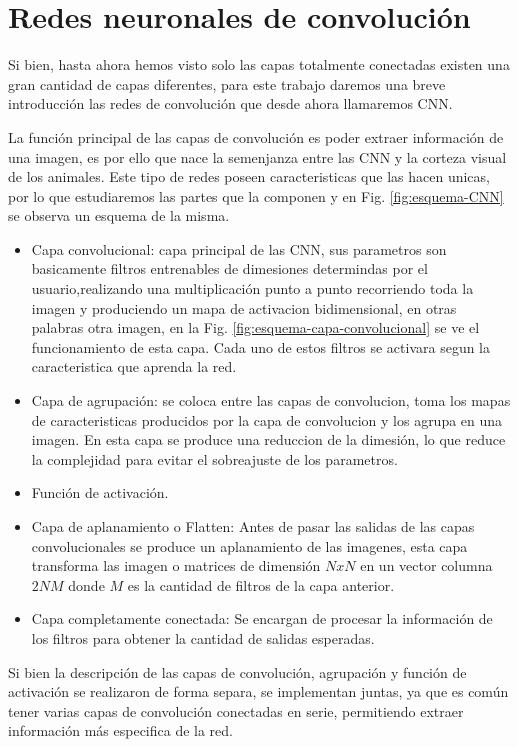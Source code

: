 \section{Redes neuronales de convolución}

Si bien, hasta ahora hemos visto solo las capas totalmente conectadas existen una gran cantidad de capas diferentes, para este trabajo daremos una breve introducción las redes de convolución que desde ahora llamaremos CNN.

La función principal de las capas de convolución es poder extraer información de una imagen, es por ello que nace la semenjanza entre las CNN y la corteza visual de los animales.
Este tipo de redes poseen caracteristicas que las hacen unicas, por lo que
estudiaremos las partes que la componen y en Fig. \ref{fig:esquema-CNN} se observa un esquema de la misma.
\begin{itemize}
    \item Capa convolucional: capa principal de las CNN, sus parametros son basicamente filtros entrenables de dimesiones determindas por el
          usuario,realizando una multiplicación punto a punto recorriendo toda la imagen y produciendo un mapa de activacion bidimensional, en otras palabras otra imagen, en la
          Fig. \ref{fig:esquema-capa-convolucional} se ve el funcionamiento de esta capa. Cada uno de estos filtros se activara segun la caracteristica que aprenda la red.
    \item Capa de agrupación: se coloca entre las capas de convolucion, toma los mapas de caracteristicas producidos por la capa de
          convolucion y los agrupa en una imagen. En esta capa se produce una reduccion de la dimesión, lo que reduce la complejidad para evitar el sobreajuste de los parametros.
    \item Función de activación.
    \item Capa de aplanamiento o Flatten: Antes de pasar las salidas de las capas convolucionales se produce un aplanamiento de las imagenes, esta capa transforma las imagen o matrices de dimensión $NxN$ en un vector columna $2NM$ donde $M$ es la cantidad de filtros de la capa anterior.
    \item Capa completamente conectada: Se encargan de procesar la información de los filtros para obtener la cantidad de salidas esperadas.
\end{itemize}

Si bien la descripción de las capas de convolución, agrupación y función de activación se realizaron de forma separa, se implementan juntas, ya que es común tener varias capas de convolución conectadas en serie, permitiendo extraer información más especifica de la red.

